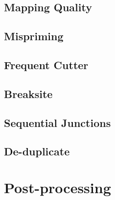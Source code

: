 \documentclass{article}
\begin{document}
\subsection*{Mapping Quality}
\paragraph{}

\subsection*{Mispriming}

\subsection*{Frequent Cutter}

\subsection*{Breaksite}

\subsection*{Sequential Junctions}

\subsection*{De-duplicate}

\section{Post-processing}
\end{document}
